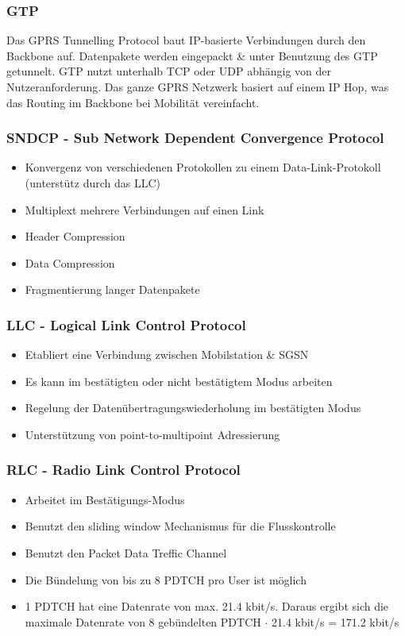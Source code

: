 \subsubsection{GTP}
Das GPRS Tunnelling Protocol baut IP-basierte Verbindungen durch den Backbone auf. Datenpakete werden eingepackt \& unter Benutzung des GTP getunnelt. GTP nutzt unterhalb TCP oder UDP  abhängig von der Nutzeranforderung. Das ganze GPRS Netzwerk basiert auf einem IP Hop, was das Routing im Backbone bei Mobilität vereinfacht.

\subsubsection{SNDCP - Sub Network Dependent Convergence Protocol}
\begin{itemize}
\item Konvergenz von verschiedenen Protokollen zu einem Data-Link-Protokoll (unterstütz durch das LLC)
\item Multiplext mehrere Verbindungen auf einen Link
\item Header Compression
\item Data Compression
\item Fragmentierung langer Datenpakete
\end{itemize}

\subsubsection{LLC - Logical Link Control Protocol}

\begin{itemize}
\item Etabliert eine Verbindung zwischen Mobilstation \& SGSN
\item Es kann im bestätigten oder nicht bestätigtem Modus arbeiten
\item Regelung der Datenübertragungswiederholung im bestätigten Modus
\item Unterstützung von point-to-multipoint Adressierung
\end{itemize}

\subsubsection{RLC - Radio Link Control Protocol}

\begin{itemize}
\item Arbeitet im Bestätigungs-Modus
\item Benutzt den sliding window Mechanismus für die Flusskontrolle
\item Benutzt den Packet Data Treffic Channel
\item Die Bündelung von bis zu 8 PDTCH pro User ist möglich
\item 1 PDTCH hat eine Datenrate von max. 21.4 kbit/s. Daraus ergibt sich die maximale Datenrate von 8 gebündelten PDTCH $\cdot$ 21.4 kbit/s = 171.2 kbit/s
\end{itemize}

